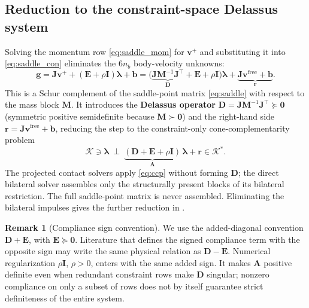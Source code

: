 \documentclass{article}
\newcommand{\M}{\mathbf{M}}
\newcommand{\Jac}{\mathbf{J}}
\newcommand{\Del}{\mathbf{D}}         %
\newcommand{\Ecomp}{\mathbf{E}}       %
\newcommand{\Aop}{\mathbf{A}}         %
\newcommand{\vv}{\mathbf{v}}
\newcommand{\vfree}{\mathbf{v}^{\mathrm{free}}}
\newcommand{\blam}{\boldsymbol{\lambda}}
\newcommand{\rhs}{\mathbf{r}}
\newcommand{\Kadm}{\mathcal{K}}          %
\newcommand{\gvel}{\mathbf{g}}           %
\newcommand{\stab}{\mathbf{b}}           %
\newcommand{\reg}{\rho}                  %
\newcommand{\Id}{\mathbf{I}}
\theoremstyle{plain}
\theoremstyle{definition}
\newtheorem{remark}{Remark}
\begin{document}
\subsection{Reduction to the constraint-space Delassus system}
\label{sec:schur_mass}
Solving the momentum row \eqref{eq:saddle_mom} for $\vv^+$ and substituting it
into \eqref{eq:saddle_con} eliminates the $6n_b$ body-velocity unknowns:
\begin{equation}
\gvel = \Jac\vv^{+}+(\Ecomp+\reg\Id)\blam+\stab
      = \bigl(\underbrace{\Jac\M^{-1}\Jac^{\top}}_{\Del}+\Ecomp+\reg\Id\bigr)\blam
       + \underbrace{\Jac\vfree+\stab}_{\rhs}.
\label{eq:schur_reduction}
\end{equation}
This is a Schur complement of the saddle-point matrix \eqref{eq:saddle} with
respect to the mass block $\M$. It introduces the \textbf{Delassus operator}
$\Del=\Jac\M^{-1}\Jac^{\top}\succeq\mathbf 0$ (symmetric positive semidefinite
because $\M\succ\mathbf 0$) and the right-hand side $\rhs=\Jac\vfree+\stab$,
reducing the step to the constraint-only cone-complementarity problem
\begin{equation}
\Kadm\ni\blam\ \perp\ \underbrace{(\Del+\Ecomp+\reg\Id)}_{\Aop}\,\blam+\rhs\in\Kadm^{*}.
\label{eq:ccp}
\end{equation}
The projected contact solvers apply \eqref{eq:ccp} without forming $\Del$;
the direct bilateral solver assembles only the structurally present blocks of
its bilateral restriction. The full saddle-point matrix is never assembled.
Eliminating the bilateral impulses gives the further reduction in
.

\begin{remark}[Compliance sign convention]
\label{rem:compliance_sign}
We use the added-diagonal convention $\Del+\Ecomp$, with
$\Ecomp\succeq\mathbf 0$. Literature that defines the signed compliance term
with the opposite sign may write the same physical relation as
$\Del-\Ecomp$. Numerical regularization $\reg\Id$, $\reg>0$, enters with the
same added sign. It makes $\Aop$ positive definite even when redundant
constraint rows make $\Del$ singular; nonzero compliance on only a subset of
rows does not by itself guarantee strict definiteness of the entire system.
\end{remark}
\end{document}
